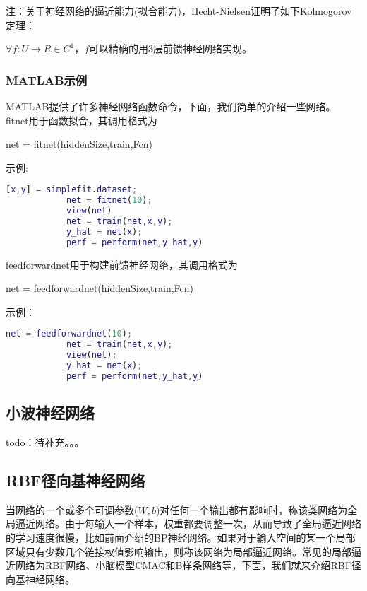             \par
            注：关于神经网络的逼近能力(拟合能力)，Hecht-Nielsen证明了如下Kolmogorov定理：
            \begin{theorem}[Kolmogorov定理]
            $\forall f:U\to R\in C^1$，$f$可以精确的用3层前馈神经网络实现。
            \end{theorem}
        \subsubsection{MATLAB示例}
            \par
            MATLAB提供了许多神经网络函数命令，下面，我们简单的介绍一些网络。\\
            fitnet用于函数拟合，其调用格式为
            \par
            net = fitnet(hiddenSize,train,Fcn)
            \par
            示例:
            \begin{lstlisting}[language = Matlab]
            [x,y] = simplefit.dataset;
            net = fitnet(10);
            view(net)
            net = train(net,x,y);
            y_hat = net(x);
            perf = perform(net,y_hat,y)
            \end{lstlisting}
            feedforwardnet用于构建前馈神经网络，其调用格式为
            \par
            net = feedforwardnet(hiddenSize,train,Fcn)
            \par
            示例：
            \begin{lstlisting}[language = Matlab]
            net = feedforwardnet(10);
            net = train(net,x,y);
            view(net);
            y_hat = net(x);
            perf = perform(net,y_hat,y)
            \end{lstlisting}

    \subsection{小波神经网络}
        \par
        todo：待补充。。。
    \subsection{RBF径向基神经网络}
        \par
        当网络的一个或多个可调参数($W,b$)对任何一个输出都有影响时，称该类网络为全局逼近网络。由于每输入一个样本，权重都要调整一次，从而导致了全局逼近网络的学习速度很慢，比如前面介绍的BP神经网络。如果对于输入空间的某一个局部区域只有少数几个链接权值影响输出，则称该网络为局部逼近网络。常见的局部逼近网络为RBF网络、小脑模型CMAC和B样条网络等，下面，我们就来介绍RBF径向基神经网络。

